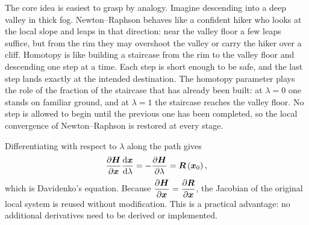 The core idea is easiest to grasp by analogy.
Imagine descending into a deep valley in thick fog.
Newton--Raphson behaves like a confident hiker who looks at the local slope and leaps in that direction: near the valley floor a few leaps suffice, but from the rim they may overshoot the valley or carry the hiker over a cliff.
Homotopy is like building a staircase from the rim to the valley floor and descending one step at a time.
Each step is short enough to be safe, and the last step lands exactly at the intended destination.
The homotopy parameter plays the role of the fraction of the staircase that has already been built: at $\lambda=0$ one stands on familiar ground, and at $\lambda=1$ the staircase reaches the valley floor.
No step is allowed to begin until the previous one has been completed, so the local convergence of Newton--Raphson is restored at every stage.

Differentiating  with respect to $\lambda$ along the path gives
\begin{gather}\label{eq:homotopy_ode}
\dfrac{\partial{\bm{H}}}{\partial{\bm{x}}}\dfrac{\mathrm{d}\bm{x}}{\mathrm{d}\lambda}=-\dfrac{\partial{\bm{H}}}{\partial{\lambda}}=\bm{R}\left(\bm{x}_0\right),
\end{gather}
which is Davidenko's equation.
Because $\dfrac{\partial{\bm{H}}}{\partial{\bm{x}}}=\dfrac{\partial{\bm{R}}}{\partial{\bm{x}}}$, the Jacobian of the original local system is reused without modification.
This is a practical advantage: no additional derivatives need to be derived or implemented.

